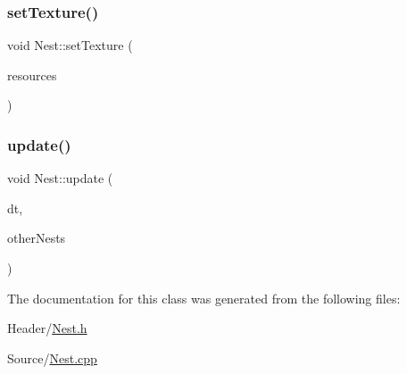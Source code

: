 \mbox{\label{class_nest_abe5daf6621900c3be55e79a8390fff54}} 
\subsubsection{\texorpdfstring{setTexture()}{setTexture()}}
{\footnotesize\ttfamily void Nest\+::set\+Texture (\begin{DoxyParamCaption}\item[{\mbox{\hyperlink{class_resource_manager}{Resource\+Manager}} \&}]{resources }\end{DoxyParamCaption})}

\mbox{\label{class_nest_adaff7cf66767b702b90b48aad3ac1e88}} 
\subsubsection{\texorpdfstring{update()}{update()}}
{\footnotesize\ttfamily void Nest\+::update (\begin{DoxyParamCaption}\item[{double}]{dt,  }\item[{std\+::vector$<$ \mbox{\hyperlink{class_nest}{Nest}} $>$ \&}]{other\+Nests }\end{DoxyParamCaption})}



The documentation for this class was generated from the following files\+:\begin{DoxyCompactItemize}
\item 
Header/\mbox{\hyperlink{_nest_8h}{Nest.\+h}}\item 
Source/\mbox{\hyperlink{_nest_8cpp}{Nest.\+cpp}}\end{DoxyCompactItemize}
